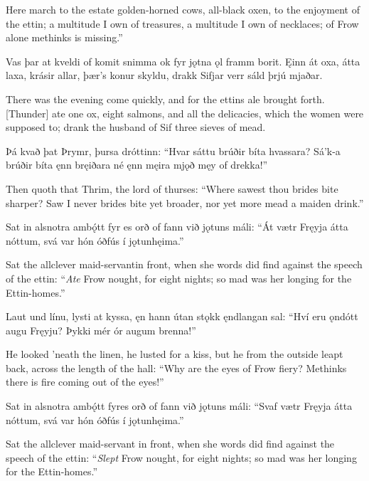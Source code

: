 Here march to the estate golden-horned cows, all-black oxen, to the enjoyment of the ettin; a multitude I own of treasures, a multitude I own of necklaces; of Frow alone methinks is missing.”

Vas þar at kveldi \hld of komit snimma
ok fyr jǫtna \hld ǫl framm borit.
Ęinn át oxa, \hld átta laxa,
krásir allar, \hld þær’s konur skyldu,
drakk Sifjar verr \hld sáld þrjú mjaðar. 

There was the evening come quickly, and for the ettins ale brought forth. [Thunder] ate one ox, eight salmons, and all the delicacies, which the women were supposed to; drank the husband of Sif three sieves of mead.

Þá kvað þat Þrymr, \hld þursa dróttinn:
“Hvar sáttu brúðir \hld bíta hvassara?
Sá’k-a brúðir \hld bíta ęnn bręiðara
né ęnn męira mjǫð \hld męy of drekka!”

Then quoth that Thrim, the lord of thurses: “Where sawest thou brides bite sharper? Saw I never brides bite yet broader, nor yet more mead a maiden drink.”

Sat in alsnotra \hld ambǫ́tt fyr
es orð of fann \hld við jǫtuns máli:
“Át vætr Fręyja \hld átta nóttum,
svá var hón óðfús \hld í jǫtunhęima.”

Sat the allclever maid-servant\footnotemark[1] in front, when she words did find against the speech of the ettin: “\emph{Ate} Frow nought, for eight nights; so mad was her longing for the Ettin-homes.\footnotemark[2]”

Laut und línu, \hld lysti at kyssa,
ęn hann útan stǫkk \hld ęndlangan sal:
“Hví eru ǫndótt \hld augu Fręyju?
Þykki mér ór \hld augum brenna!”

He looked ’neath the linen, he lusted for a kiss, but he from the outside leapt back, across the length of the hall: “Why are the eyes of Frow fiery? Methinks there is fire coming out of the eyes!\footnotemark[1]”

Sat in alsnotra \hld ambǫ́tt fyr\footnotemark[1]
es orð of fann \hld við jǫtuns máli:
“Svaf vætr Fręyja \hld átta nóttum,
svá var hón óðfús \hld í jǫtunhęima.”

Sat the allclever maid-servant in front, when she words did find against the speech of the ettin: “\emph{Slept} Frow nought, for eight nights; so mad was her longing for the Ettin-homes.”

